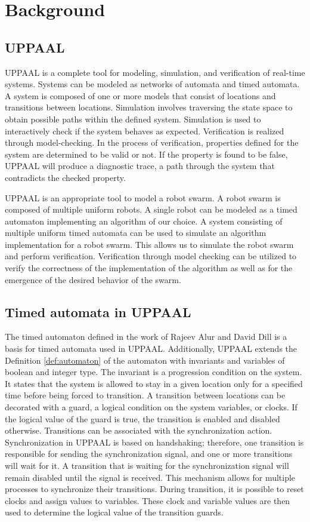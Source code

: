 \section{Background}

\subsection{UPPAAL}
UPPAAL \cite{Larsen1997} is a complete tool for modeling, simulation, and verification of real-time systems. Systems can be modeled as networks of automata and timed automata. A system is composed of one or more models that consist of locations and transitions between locations. Simulation involves traversing the state space to obtain possible paths within the defined system. Simulation is used to interactively check if the system behaves as expected. Verification is realized through model-checking. In the process of verification, properties defined for the system are determined to be valid or not. If the property is found to be false, UPPAAL will produce a diagnostic trace, a path through the system that contradicts the checked property. 

UPPAAL is an appropriate tool to model a robot swarm. A robot swarm is composed of multiple uniform robots. A single robot can be modeled as a timed automaton implementing an algorithm of our choice. A system consisting of multiple uniform timed automata can be used to simulate an algorithm implementation for a robot swarm. This allows us to simulate the robot swarm and perform verification. Verification through model checking can be utilized to verify the correctness of the implementation of the algorithm as well as for the emergence of the desired behavior of the swarm.


\subsection{Timed automata in UPPAAL}
The timed automaton defined in the work of Rajeev Alur and David Dill \cite{Alur1990} is a basis for timed automata used in UPPAAL. Additionally, UPPAAL extends the Definition \ref{def:automaton} of the automaton with invariants and variables of boolean and integer type. The invariant is a progression condition on the system. It states that the system is allowed to stay in a given location only for a specified time before being forced to transition. A transition between locations can be decorated with a guard, a logical condition on the system variables, or clocks. If the logical value of the guard is true, the transition is enabled and disabled otherwise. Transitions can be associated with the synchronization action. Synchronization in UPPAAL is based on handshaking; therefore, one transition is responsible for sending the synchronization signal, and one or more transitions will wait for it. A transition that is waiting for the synchronization signal will remain disabled until the signal is received. This mechanism allows for multiple processes to synchronize their transitions. During transition, it is possible to reset clocks and assign values to variables. These clock and variable values are then used to determine the logical value of the transition guards.


